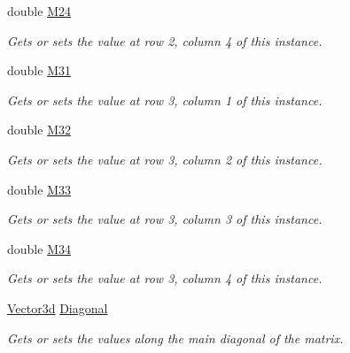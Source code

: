 \begin{DoxyCompactItemize}
double \hyperlink{struct_open_t_k_1_1_matrix3x4d_a2a3a0bb1cc85f7a4addb978ef65e8824}{M24}
\begin{DoxyCompactList}\small\item\em Gets or sets the value at row 2, column 4 of this instance. \end{DoxyCompactList}\item 
double \hyperlink{struct_open_t_k_1_1_matrix3x4d_ae5d48c56739dc8c024bfab361c9e4f55}{M31}
\begin{DoxyCompactList}\small\item\em Gets or sets the value at row 3, column 1 of this instance. \end{DoxyCompactList}\item 
double \hyperlink{struct_open_t_k_1_1_matrix3x4d_a0774ba86b773d65e7ed68269afce59a1}{M32}
\begin{DoxyCompactList}\small\item\em Gets or sets the value at row 3, column 2 of this instance. \end{DoxyCompactList}\item 
double \hyperlink{struct_open_t_k_1_1_matrix3x4d_a2a96e4092590cc10611b16a055ee0c40}{M33}
\begin{DoxyCompactList}\small\item\em Gets or sets the value at row 3, column 3 of this instance. \end{DoxyCompactList}\item 
double \hyperlink{struct_open_t_k_1_1_matrix3x4d_abeee8ae82517d78e46f8975167bac0ab}{M34}
\begin{DoxyCompactList}\small\item\em Gets or sets the value at row 3, column 4 of this instance. \end{DoxyCompactList}\item 
\hyperlink{struct_open_t_k_1_1_vector3d}{Vector3d} \hyperlink{struct_open_t_k_1_1_matrix3x4d_ae5b9c7ad844625095b20c05ac169b789}{Diagonal}
\begin{DoxyCompactList}\small\item\em Gets or sets the values along the main diagonal of the matrix. \end{DoxyCompactList}\item 

\end{DoxyCompactItemize}
